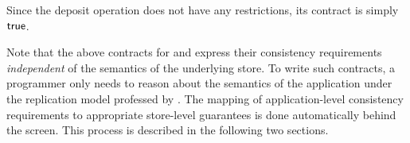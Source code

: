 Since the deposit operation does not have any restrictions, its
contract is simply $\textsf{true}$.

Note that the above contracts for  and 
express their consistency requirements \emph{independent} of the
semantics of the underlying store. To write such contracts, a
programmer only needs to reason about the semantics of the application
under the replication model professed by \name. The mapping of
application-level consistency requirements to appropriate store-level
guarantees is done automatically behind the screen. This process is
described in the following two sections.





